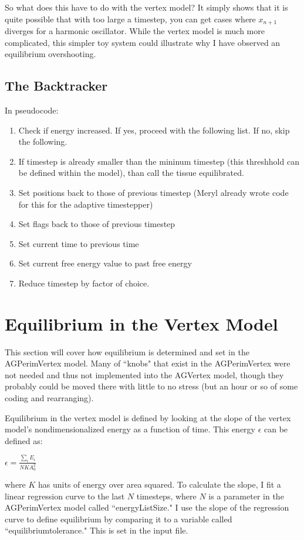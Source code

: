 \documentclass[12pt,a4paper]{article}
\begin{document}
So what does this have to do with the vertex model? It simply shows that it is quite possible that with too large a timestep, you can get cases where $x_{n+1}$ diverges for a harmonic oscillator. While the vertex model is much more complicated, this simpler toy system could illustrate why I have observed an equilibrium overshooting.

\subsection{The Backtracker}
In pseudocode:

\begin{enumerate}
	\item Check if energy increased. If yes, proceed with the following list. If no, skip the following.
	\item If timestep is already smaller than the mininum timestep (this threshhold can be defined within the model), than call the tissue equilibrated. 
	\item Set positions back to those of previous timestep (Meryl already wrote code for this for the adaptive timestepper)
	\item Set flags back to those of previous timestep
	\item Set current time to previous time
	\item Set current free energy value to past free energy
	\item Reduce timestep by factor of choice. 
\end{enumerate} 

\section{Equilibrium in the Vertex Model}
This section will cover how equilibrium is determined and set in the AGPerimVertex model. Many of ``knobs" that exist in the AGPerimVertex were not needed and thus not implemented into the AGVertex model, though they probably could be moved there with little to no stress (but an hour or so of some coding and rearranging). 

Equilibrium in the vertex model is defined by looking at the slope of the vertex model's nondimensionalized energy as a function of time. This energy $\epsilon$ can be defined as:

\begin{center}
	\begin{math}
		\epsilon = \frac{\sum_i{E_i}}{N K A_0^2}
	\end{math}
\end{center}
where $K$ has units of energy over area squared. To calculate the slope, I fit a linear regression curve to the last $N$ timesteps, where $N$ is a parameter in the AGPerimVertex model called ``energyListSize." I use the slope of the regression curve to define equilibrium by comparing it to a variable called ``equilibriumtolerance." This is set in the input file.
\end{document}
